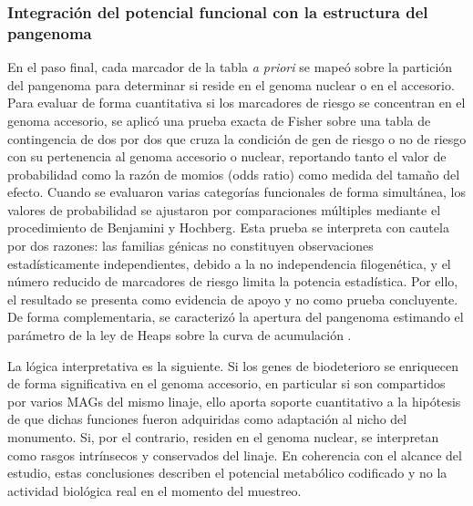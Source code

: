 \subsubsection{Integración del potencial funcional con la estructura del pangenoma}

En el paso final, cada marcador de la tabla \textit{a priori} se mapeó sobre la partición del pangenoma para determinar si reside en el genoma nuclear o en el accesorio. Para evaluar de forma cuantitativa si los marcadores de riesgo se concentran en el genoma accesorio, se aplicó una prueba exacta de Fisher sobre una tabla de contingencia de dos por dos que cruza la condición de gen de riesgo o no de riesgo con su pertenencia al genoma accesorio o nuclear, reportando tanto el valor de probabilidad como la razón de momios (odds ratio) como medida del tamaño del efecto. Cuando se evaluaron varias categorías funcionales de forma simultánea, los valores de probabilidad se ajustaron por comparaciones múltiples mediante el procedimiento de Benjamini y Hochberg. Esta prueba se interpreta con cautela por dos razones: las familias génicas no constituyen observaciones estadísticamente independientes, debido a la no independencia filogenética, y el número reducido de marcadores de riesgo limita la potencia estadística. Por ello, el resultado se presenta como evidencia de apoyo y no como prueba concluyente. De forma complementaria, se caracterizó la apertura del pangenoma estimando el parámetro de la ley de Heaps sobre la curva de acumulación \cite{tettelin2005}.

La lógica interpretativa es la siguiente. Si los genes de biodeterioro se enriquecen de forma significativa en el genoma accesorio, en particular si son compartidos por varios MAGs del mismo linaje, ello aporta soporte cuantitativo a la hipótesis de que dichas funciones fueron adquiridas como adaptación al nicho del monumento. Si, por el contrario, residen en el genoma nuclear, se interpretan como rasgos intrínsecos y conservados del linaje. En coherencia con el alcance del estudio, estas conclusiones describen el potencial metabólico codificado y no la actividad biológica real en el momento del muestreo.

